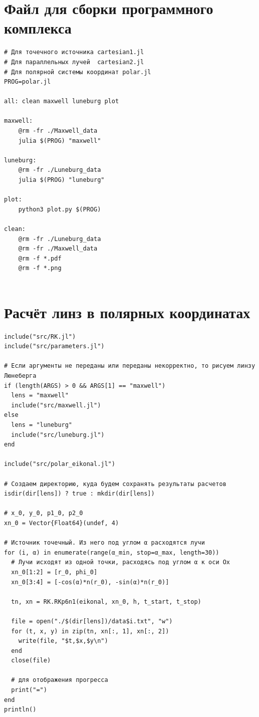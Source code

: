 \documentclass[
  english,
  russian,
  12pt,
  a4paper,
]{phdthesr}
\begin{document}
\section{Файл для сборки программного
комплекса}\label{ux444ux430ux439ux43b-ux434ux43bux44f-ux441ux431ux43eux440ux43aux438-ux43fux440ux43eux433ux440ux430ux43cux43cux43dux43eux433ux43e-ux43aux43eux43cux43fux43bux435ux43aux441ux430}

\begin{verbatim}
# Для точечного источника cartesian1.jl
# Для параллельных лучей  cartesian2.jl
# Для полярной системы координат polar.jl
PROG=polar.jl

all: clean maxwell luneburg plot

maxwell:
	@rm -fr ./Maxwell_data
	julia $(PROG) "maxwell"

luneburg:
	@rm -fr ./Luneburg_data
	julia $(PROG) "luneburg"

plot:
	python3 plot.py $(PROG)

clean:
	@rm -fr ./Luneburg_data
	@rm -fr ./Maxwell_data
	@rm -f *.pdf
	@rm -f *.png


\end{verbatim}

\section{Расчёт линз в полярных
координатах}\label{ux440ux430ux441ux447ux451ux442-ux43bux438ux43dux437-ux432-ux43fux43eux43bux44fux440ux43dux44bux445-ux43aux43eux43eux440ux434ux438ux43dux430ux442ux430ux445}

\begin{verbatim}
include("src/RK.jl")
include("src/parameters.jl")

# Если аргументы не переданы или переданы некорректно, то рисуем линзу Люнеберга
if (length(ARGS) > 0 && ARGS[1] == "maxwell")
  lens = "maxwell"
  include("src/maxwell.jl")
else 
  lens = "luneburg"
  include("src/luneburg.jl")
end

include("src/polar_eikonal.jl")

# Создаем директорию, куда будем сохранять результаты расчетов
isdir(dir[lens]) ? true : mkdir(dir[lens])

# x_0, y_0, p1_0, p2_0
xn_0 = Vector{Float64}(undef, 4)

# Источник точечный. Из него под углом α расходятся лучи
for (i, α) in enumerate(range(α_min, stop=α_max, length=30))
  # Лучи исходят из одной точки, расходясь под углом α к оси Ох
  xn_0[1:2] = [r_0, phi_0]
  xn_0[3:4] = [-cos(α)*n(r_0), -sin(α)*n(r_0)]

  tn, xn = RK.RKp6n1(eikonal, xn_0, h, t_start, t_stop)

  file = open("./$(dir[lens])/data$i.txt", "w")
  for (t, x, y) in zip(tn, xn[:, 1], xn[:, 2])
    write(file, "$t,$x,$y\n")
  end
  close(file)
  
  # для отображения прогресса
  print("=")
end
println()

\end{verbatim}


\printbibliography
\end{document}
